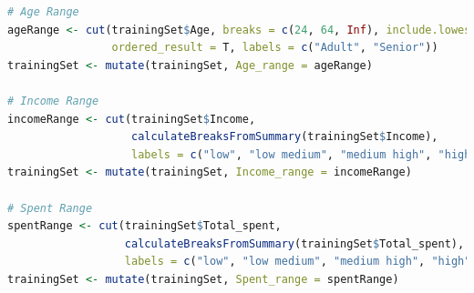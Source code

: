 \documentclass[letterpaper,11pt]{article}
\begin{document}
\begin{lstlisting}[language=R]
# Age Range
ageRange <- cut(trainingSet$Age, breaks = c(24, 64, Inf), include.lowest = T,
                ordered_result = T, labels = c("Adult", "Senior"))
trainingSet <- mutate(trainingSet, Age_range = ageRange)

# Income Range
incomeRange <- cut(trainingSet$Income, 
                   calculateBreaksFromSummary(trainingSet$Income),
                   labels = c("low", "low medium", "medium high", "high"))
trainingSet <- mutate(trainingSet, Income_range = incomeRange)

# Spent Range
spentRange <- cut(trainingSet$Total_spent, 
                  calculateBreaksFromSummary(trainingSet$Total_spent),
                  labels = c("low", "low medium", "medium high", "high"))
trainingSet <- mutate(trainingSet, Spent_range = spentRange)
\end{lstlisting}
\end{document}
